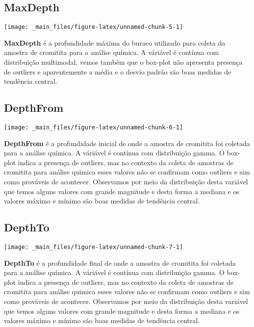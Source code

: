 \documentclass[
]{article}
\begin{document}
\hypertarget{maxdepth}{%
\subsection{MaxDepth}\label{maxdepth}}

\begin{center}\texttt{[image: \_main\_files/figure-latex/unnamed-chunk-5-1]} \end{center}

\textbf{MaxDepth} é a profundidade máxima do buraco utilizado para coleta da amostra de cromitita para a análise química. A váriável é contínua com distribuição multimodal, vemos também que o box-plot não apresenta presença de outliers e aparentemente a média e o desvio padrão são boas medidas de tendência central.

\hypertarget{depthfrom}{%
\subsection{DepthFrom}\label{depthfrom}}

\begin{center}\texttt{[image: \_main\_files/figure-latex/unnamed-chunk-6-1]} \end{center}

\textbf{DepthFrom} é a profundidade inicial de onde a amostra de cromitita foi coletada para a análise química. A váriável é contínua com distribuição gamma. O box-plot indica a presença de outliers, mas no contexto da coleta de amostras de cromitita para análise quimica esses valores não se confirmam como outliers e sim como prováveis de acontecer. Observamos por meio da distribuição desta variável que temos alguns valores com grande magnitude e desta forma a mediana e os valores máximo e mínimo são boas medidas de tendência central.

\hypertarget{depthto}{%
\subsection{DepthTo}\label{depthto}}

\begin{center}\texttt{[image: \_main\_files/figure-latex/unnamed-chunk-7-1]} \end{center}

\textbf{DepthTo} é a profundidade final de onde a amostra de cromitita foi coletada para a análise química. A váriável é contínua com distribuição gamma. O box-plot indica a presença de outliers, mas no contexto da coleta de amostras de cromitita para análise quimica esses valores não se confirmam como outliers e sim como prováveis de acontecer. Observamos por meio da distribuição desta variável que temos alguns valores com grande magnitude e desta forma a mediana e os valores máximo e mínimo são boas medidas de tendência central.
\end{document}
